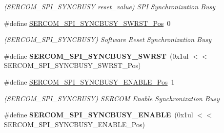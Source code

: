 \begin{DoxyCompactItemize}
\begin{DoxyCompactList}\small\item\em (S\+E\+R\+C\+O\+M\+\_\+\+S\+P\+I\+\_\+\+S\+Y\+N\+C\+B\+U\+S\+Y reset\+\_\+value) S\+P\+I Synchronization Busy \end{DoxyCompactList}\item 
\hypertarget{group___s_a_m_l21___s_e_r_c_o_m_ga221547cf3845e652680f4f0287ede7dd}{}\#define \hyperlink{group___s_a_m_l21___s_e_r_c_o_m_ga221547cf3845e652680f4f0287ede7dd}{S\+E\+R\+C\+O\+M\+\_\+\+S\+P\+I\+\_\+\+S\+Y\+N\+C\+B\+U\+S\+Y\+\_\+\+S\+W\+R\+S\+T\+\_\+\+Pos}~0\label{group___s_a_m_l21___s_e_r_c_o_m_ga221547cf3845e652680f4f0287ede7dd}

\begin{DoxyCompactList}\small\item\em (S\+E\+R\+C\+O\+M\+\_\+\+S\+P\+I\+\_\+\+S\+Y\+N\+C\+B\+U\+S\+Y) Software Reset Synchronization Busy \end{DoxyCompactList}\item 
\hypertarget{group___s_a_m_l21___s_e_r_c_o_m_gac7e8e04dff7744ff7b6114cc3b048dfb}{}\#define {\bfseries S\+E\+R\+C\+O\+M\+\_\+\+S\+P\+I\+\_\+\+S\+Y\+N\+C\+B\+U\+S\+Y\+\_\+\+S\+W\+R\+S\+T}~(0x1ul $<$$<$ S\+E\+R\+C\+O\+M\+\_\+\+S\+P\+I\+\_\+\+S\+Y\+N\+C\+B\+U\+S\+Y\+\_\+\+S\+W\+R\+S\+T\+\_\+\+Pos)\label{group___s_a_m_l21___s_e_r_c_o_m_gac7e8e04dff7744ff7b6114cc3b048dfb}

\item 
\hypertarget{group___s_a_m_l21___s_e_r_c_o_m_gaa94b9d18dcdf09c40860e2ed2738b430}{}\#define \hyperlink{group___s_a_m_l21___s_e_r_c_o_m_gaa94b9d18dcdf09c40860e2ed2738b430}{S\+E\+R\+C\+O\+M\+\_\+\+S\+P\+I\+\_\+\+S\+Y\+N\+C\+B\+U\+S\+Y\+\_\+\+E\+N\+A\+B\+L\+E\+\_\+\+Pos}~1\label{group___s_a_m_l21___s_e_r_c_o_m_gaa94b9d18dcdf09c40860e2ed2738b430}

\begin{DoxyCompactList}\small\item\em (S\+E\+R\+C\+O\+M\+\_\+\+S\+P\+I\+\_\+\+S\+Y\+N\+C\+B\+U\+S\+Y) S\+E\+R\+C\+O\+M Enable Synchronization Busy \end{DoxyCompactList}\item 
\hypertarget{group___s_a_m_l21___s_e_r_c_o_m_gab5cdfadb41e797615bda4732f8b10e89}{}\#define {\bfseries S\+E\+R\+C\+O\+M\+\_\+\+S\+P\+I\+\_\+\+S\+Y\+N\+C\+B\+U\+S\+Y\+\_\+\+E\+N\+A\+B\+L\+E}~(0x1ul $<$$<$ S\+E\+R\+C\+O\+M\+\_\+\+S\+P\+I\+\_\+\+S\+Y\+N\+C\+B\+U\+S\+Y\+\_\+\+E\+N\+A\+B\+L\+E\+\_\+\+Pos)\label{group___s_a_m_l21___s_e_r_c_o_m_gab5cdfadb41e797615bda4732f8b10e89}


\end{DoxyCompactItemize}
